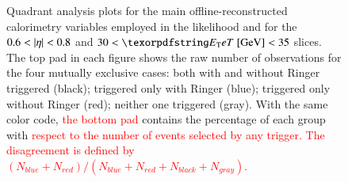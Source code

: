 \begin{figure}[h!]


\caption{%
	Quadrant analysis plots for the main offline-reconstructed
	calorimetry variables employed in the
	likelihood and for the $0.6<\abseta{}<0.8$ and
	$30<\et{}~[\text{GeV}]<35$ slices. 
	The top pad in each figure shows the raw number of observations for the four mutually exclusive cases: both with and without Ringer
	triggered (black); triggered only with Ringer (blue); triggered only without Ringer (red); neither one triggered (gray). With the same color code, \textcolor{red}{the bottom pad} contains the percentage of each group with \textcolor{red}{respect to the number of events selected by any trigger. The disagreement is defined by $(N_{blue}+N_{red})/(N_{blue}+N_{red}+N_{black}+N_{gray})$.}
}
\end{figure}

